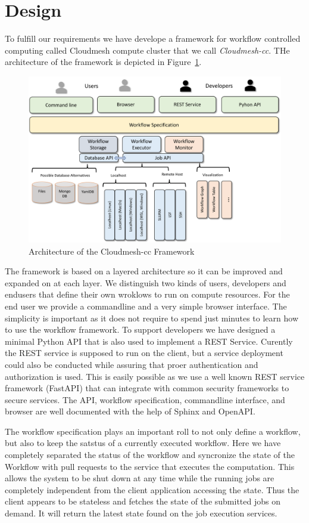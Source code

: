 
\section{Design}

To fulfill our requirements we have develope a framework for workflow
controlled computing called Cloudmesh compute cluster that we call
{\em Cloudmesh-cc}. THe architecture of the framework is depicted in
Figure~\ref{fig:arch}.

\begin{figure}[htb]
\centering
\includegraphics[width=0.7\columnwidth]{images/cloudmesh-cc-arch.pdf}
\caption{Architecture of the Cloudmesh-cc Framework}\label{fig:arch}
\end{figure}

The framework is based on a layered architecture so it can be improved
and expanded on at each layer. We distinguish two kinds of users,
developers and endusers that define their own wroklows to run on
compute resources. For the end user we provide a commandline and a
very simple browser interface. The simplicity is important as it does
not require to spend just minutes to learn how to use the workflow
framework.  To support developers we have designed a minimal Python
API that is also used to implement a REST Service. Curently the REST
service is supposed to run on the client, but a service deployment
could also be conducted while assuring that proer authentication and
authorization is used. This is easily possible as we use a well known
REST service framework (FastAPI) that can integrate with common
security frameworks to secure services. The API, workflow
specification, commandline interface, and browser are well documented
with the help of Sphinx and OpenAPI.

The workflow specification plays an important roll to not only define
a workflow, but also to keep the satstus of a currently executed
workflow. Here we have completely separated the status of the workflow
and syncronize the state of the Workflow with pull requests to the
service that executes the computation. This allows the system to be
shut down at any time while the running jobs are completely
independent from the client application accessing the state. Thus the
client appears to be stateless and fetches the state of the submitted
jobs on demand. It will return the latest state found on the job
execution services.


